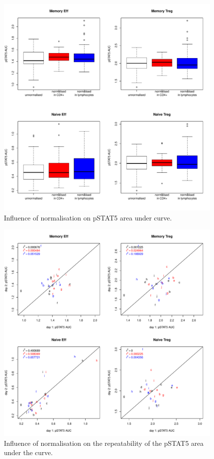 \begin{figure}[h]
    \centering
    \includegraphics[scale=.5]{IL2/figures/pstat5-auc-boxplots-celltypes.pdf}
    { Influence of normalisation on pSTAT5 area under curve. }
    { }
\end{figure}


\begin{figure}[h]
    \centering
    \includegraphics[scale=.5]{IL2/figures/pstat5-auc-repeatability-celltypes.pdf}
    { Influence of normalisation on the repeatability of the pSTAT5 area under the curve. }
    { }
\end{figure}


